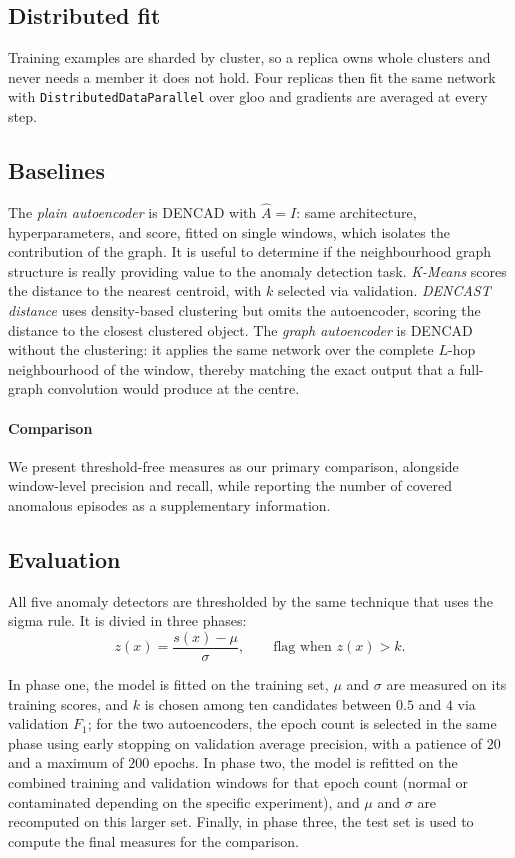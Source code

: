 \documentclass{article}
\begin{document}
\subsection{Distributed fit}

Training examples are sharded by cluster, so a replica owns whole clusters and never needs
a member it does not hold. Four
replicas then fit the same network with \texttt{DistributedDataParallel} over gloo and
gradients are averaged at every step.

\subsection{Baselines}

The \emph{plain autoencoder} is DENCAD with $\hat{A} = I$: same architecture,
hyperparameters, and score, fitted on single windows, which isolates the contribution of
the graph. It is useful to determine if the neighbourhood graph structure is really providing 
value to the anomaly detection task. \emph{K-Means} scores the distance to the nearest centroid, 
with $k$ selected via validation. \emph{DENCAST distance} uses density-based clustering but 
omits the autoencoder, scoring the distance to the closest clustered object. The \emph{graph
autoencoder} is DENCAD without the clustering: it applies the same network over the complete 
$L$-hop neighbourhood of the window, thereby matching the exact output that a full-graph 
convolution would produce at the centre.

\paragraph{Comparison} We present threshold-free measures as our primary comparison, 
alongside window-level precision and recall, while reporting the number of 
covered anomalous episodes as a supplementary information.


\subsection{Evaluation}

All five anomaly detectors are thresholded by the same technique that uses the sigma rule. It is divied in three phases:
\begin{equation}
  z(x) = \frac{s(x) - \mu}{\sigma}, \qquad \text{flag when } z(x) > k .
\end{equation}

In phase one, the model is fitted on the training set, $\mu$ and $\sigma$ are measured on its
training scores, and $k$ is chosen among ten candidates
between $0.5$ and $4$ via validation $F_1$; for the two autoencoders, the epoch count is
selected in the same phase using early stopping on validation average precision, with a
patience of $20$ and a maximum of $200$ epochs. In phase two, the model is refitted on the 
combined training and validation windows for that epoch count (normal or contaminated depending on the specific experiment), and $\mu$ and $\sigma$ are
recomputed on this larger set. Finally, in phase three, the test set is used to compute the final measures for the comparison.
\end{document}

